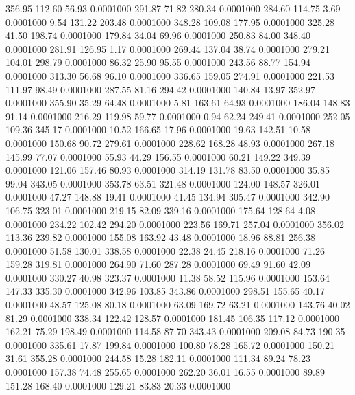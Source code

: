  356.95  112.60   56.93   0.0001000
 291.87   71.82  280.34   0.0001000
 284.60  114.75    3.69   0.0001000
   9.54  131.22  203.48   0.0001000
 348.28  109.08  177.95   0.0001000
 325.28   41.50  198.74   0.0001000
 179.84   34.04   69.96   0.0001000
 250.83   84.00  348.40   0.0001000
 281.91  126.95    1.17   0.0001000
 269.44  137.04   38.74   0.0001000
 279.21  104.01  298.79   0.0001000
  86.32   25.90   95.55   0.0001000
 243.56   88.77  154.94   0.0001000
 313.30   56.68   96.10   0.0001000
 336.65  159.05  274.91   0.0001000
 221.53  111.97   98.49   0.0001000
 287.55   81.16  294.42   0.0001000
 140.84   13.97  352.97   0.0001000
 355.90   35.29   64.48   0.0001000
   5.81  163.61   64.93   0.0001000
 186.04  148.83   91.14   0.0001000
 216.29  119.98   59.77   0.0001000
   0.94   62.24  249.41   0.0001000
 252.05  109.36  345.17   0.0001000
  10.52  166.65   17.96   0.0001000
  19.63  142.51   10.58   0.0001000
 150.68   90.72  279.61   0.0001000
 228.62  168.28   48.93   0.0001000
 267.18  145.99   77.07   0.0001000
  55.93   44.29  156.55   0.0001000
  60.21  149.22  349.39   0.0001000
 121.06  157.46   80.93   0.0001000
 314.19  131.78   83.50   0.0001000
  35.85   99.04  343.05   0.0001000
 353.78   63.51  321.48   0.0001000
 124.00  148.57  326.01   0.0001000
  47.27  148.88   19.41   0.0001000
  41.45  134.94  305.47   0.0001000
 342.90  106.75  323.01   0.0001000
 219.15   82.09  339.16   0.0001000
 175.64  128.64    4.08   0.0001000
 234.22  102.42  294.20   0.0001000
 223.56  169.71  257.04   0.0001000
 356.02  113.36  239.82   0.0001000
 155.08  163.92   43.48   0.0001000
  18.96   88.81  256.38   0.0001000
  51.58  130.01  338.58   0.0001000
  22.38   24.45  218.16   0.0001000
  71.26  159.28  319.81   0.0001000
 264.90   71.60  287.28   0.0001000
  69.49   91.60   42.09   0.0001000
 330.27   40.98  323.37   0.0001000
  11.38   58.52  115.96   0.0001000
 153.64  147.33  335.30   0.0001000
 342.96  103.85  343.86   0.0001000
 298.51  155.65   40.17   0.0001000
  48.57  125.08   80.18   0.0001000
  63.09  169.72   63.21   0.0001000
 143.76   40.02   81.29   0.0001000
 338.34  122.42  128.57   0.0001000
 181.45  106.35  117.12   0.0001000
 162.21   75.29  198.49   0.0001000
 114.58   87.70  343.43   0.0001000
 209.08   84.73  190.35   0.0001000
 335.61   17.87  199.84   0.0001000
 100.80   78.28  165.72   0.0001000
 150.21   31.61  355.28   0.0001000
 244.58   15.28  182.11   0.0001000
 111.34   89.24   78.23   0.0001000
 157.38   74.48  255.65   0.0001000
 262.20   36.01   16.55   0.0001000
  89.89  151.28  168.40   0.0001000
 129.21   83.83   20.33   0.0001000
